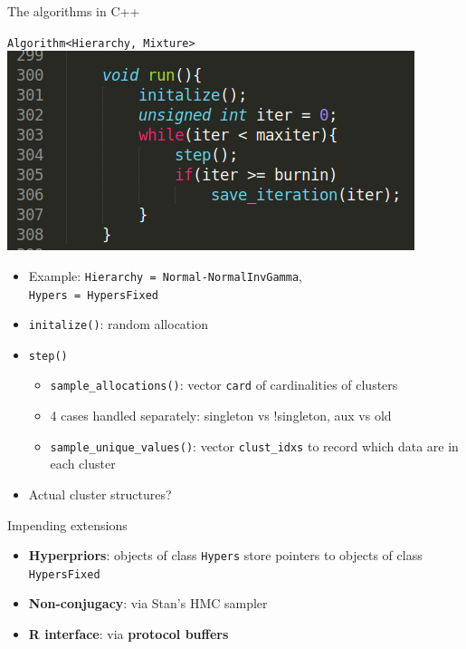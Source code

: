 \begin{frame}{The algorithms in C++}
	\begin{center}
		\texttt{Algorithm<Hierarchy, Mixture>}
		\includegraphics[scale=0.4]{../etc/neal8_2.png}
	\end{center}
	\begin{itemize}
		\item Example: \texttt{Hierarchy = Normal-NormalInvGamma}, \\ \texttt{Hypers = HypersFixed}
		\item \texttt{initalize()}: random allocation
		\item \texttt{step()}
		\begin{itemize}
			\item \texttt{sample\_allocations()}: vector \texttt{card} of cardinalities of clusters
			\item 4 cases handled separately: singleton vs !singleton, aux vs old
			\item \texttt{sample\_unique\_values()}: vector \texttt{clust\_idxs} to record which data are in each cluster
		\end{itemize}
		\item Actual cluster structures?
	\end{itemize}
\end{frame}


\begin{frame}{Impending extensions}
	\begin{itemize}
	   \item \textbf{Hyperpriors}: objects of class \texttt{Hypers} store pointers to objects of class \texttt{HypersFixed} %
	   \item \textbf{Non-conjugacy}: via Stan's HMC sampler
	   \item  \textbf{R interface}: via \textbf{protocol buffers}
	\end{itemize}
\end{frame}

